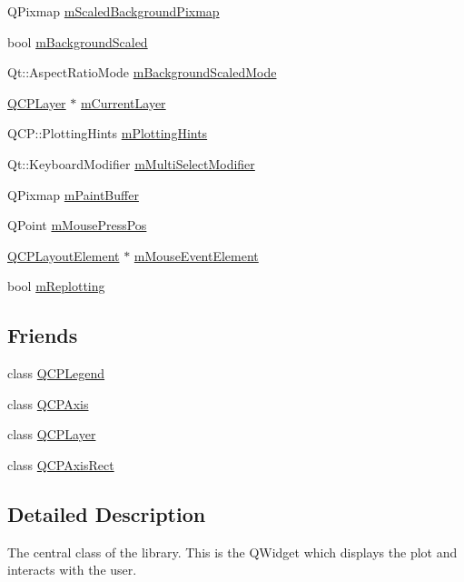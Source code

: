 \begin{DoxyCompactItemize}
\item 
Q\-Pixmap \hyperlink{class_q_custom_plot_a081bf046501d52642dc6d7e3bdb97d57}{m\-Scaled\-Background\-Pixmap}
\item 
bool \hyperlink{class_q_custom_plot_a62fe584b20680b1b2e1c7efb5c5416a5}{m\-Background\-Scaled}
\item 
Qt\-::\-Aspect\-Ratio\-Mode \hyperlink{class_q_custom_plot_ab82e8a5e3ad6b486f95d6da8bf49e9aa}{m\-Background\-Scaled\-Mode}
\item 
\hyperlink{class_q_c_p_layer}{Q\-C\-P\-Layer} $\ast$ \hyperlink{class_q_custom_plot_aa27569c92e74395af10151357d268628}{m\-Current\-Layer}
\item 
Q\-C\-P\-::\-Plotting\-Hints \hyperlink{class_q_custom_plot_aa184197a6101a9cc5807469e1d006c9e}{m\-Plotting\-Hints}
\item 
Qt\-::\-Keyboard\-Modifier \hyperlink{class_q_custom_plot_a0e97e701c5671e7e463d2ce0211d0f8a}{m\-Multi\-Select\-Modifier}
\item 
Q\-Pixmap \hyperlink{class_q_custom_plot_a753630df96e0672098d9e88bd41d1913}{m\-Paint\-Buffer}
\item 
Q\-Point \hyperlink{class_q_custom_plot_ac57090da95056ae4dd67be67adfa85bd}{m\-Mouse\-Press\-Pos}
\item 
\hyperlink{class_q_c_p_layout_element}{Q\-C\-P\-Layout\-Element} $\ast$ \hyperlink{class_q_custom_plot_a9ef6aa831ac6c71a058fa84b1d5fb152}{m\-Mouse\-Event\-Element}
\item 
bool \hyperlink{class_q_custom_plot_ab30daeca6612c3948afd368dce5f1c39}{m\-Replotting}
\end{DoxyCompactItemize}
\subsection*{Friends}
\begin{DoxyCompactItemize}
\item 
class \hyperlink{class_q_custom_plot_a8429035e7adfbd7f05805a6530ad5e3b}{Q\-C\-P\-Legend}
\item 
class \hyperlink{class_q_custom_plot_af123edeca169ec7a31958a1d714e1a8a}{Q\-C\-P\-Axis}
\item 
class \hyperlink{class_q_custom_plot_a5dbf96bf7664c1b6fce49063eeea6eef}{Q\-C\-P\-Layer}
\item 
class \hyperlink{class_q_custom_plot_acbf20ecb140f66c5fd1bc64ae0762990}{Q\-C\-P\-Axis\-Rect}
\end{DoxyCompactItemize}


\subsection{Detailed Description}
The central class of the library. This is the Q\-Widget which displays the plot and interacts with the user. 

